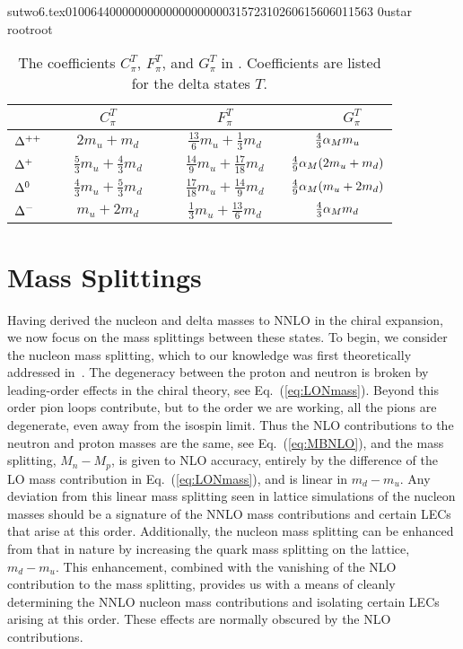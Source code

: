                                                                                                                                                                                                                                                                                       sutwo6.tex                                                                                          0100644 0000000 0000000 00000315723 10260615606 011563  0                                                                                                    ustar   root                            root                                                                                                                                                                                                                   \documentclass[prd,amssymb,amsmath,showpacs,nofootinbib,superscriptaddress]{revtex4}
\begin{document}
\begin{table}
\caption{The coefficients $C_\pi^T$, $F_\pi^T$, and $G_\pi^T$ in \CPT. Coefficients are
listed for the delta states $T$.}
\begin{tabular}{l | c c c }
 & $\quad \quad \quad C_\pi^T \quad \quad \quad $  
 & $\quad \quad \quad F_\pi^T \quad \quad \quad$ 
 & $\quad \quad \quad G_\pi^T  \quad  $ \\
\hline
${\Delta}^{++}$       
 & $2 m_u + m_d$  
 & $\frac{13}{6} m_u + \frac{1}{3} m_d$ 
 & $\frac{4}{3} {\alpha}_M m_u$    \\
${\Delta}^+$ 
 & $\frac{5}{3} m_u + \frac{4}{3} m_d$ 
 & $\frac{14}{9} m_u + \frac{17}{18} m_d$ 
 & $\frac{4}{9} {\alpha}_M ( 2 m_u + m_d )$\\
${\Delta}^0$    
 & $\frac{4}{3} m_u + \frac{5}{3} m_d$  
 & $\frac{17}{18} m_u + \frac{14}{9} m_d$ 
 & $\frac{4}{9} {\alpha}_M (m_u + 2 m_d)$\\
${\Delta}^-$ 
 & $m_u + 2 m_d$ 
 & $\frac{1}{3} m_u + \frac{13}{6} m_d$ 
 & $\frac{4}{3} {\alpha}_M m_d$  \\
 \end{tabular}
\label{t:QCD-C}
\end{table}

%
%
%
%
%
%
%
%
%
%
%
%
\section{Mass Splittings}\label{MSplit}

Having derived the nucleon and delta masses to NNLO in the chiral
expansion, we now focus on the mass splittings between these states.
To begin, we consider the nucleon mass splitting, which to our knowledge was first theoretically addressed in~\cite{Gasser:1974wd}. The degeneracy
between the proton and neutron is broken by leading-order effects
in the chiral theory, see Eq.~(\ref{eq:LONmass}). Beyond this order
pion loops contribute, but to the order we are working, all the pions
are degenerate, even away from the isospin limit.  Thus the
NLO contributions to the neutron and proton masses are the same,
see Eq.~(\ref{eq:MBNLO}), and the mass splitting, $M_n
- M_p$, is given to NLO accuracy, entirely by the difference of the LO mass
contribution in Eq.~(\ref{eq:LONmass}), and is linear 
in $m_d - m_u$.   Any deviation from this linear mass splitting seen in
lattice simulations of the nucleon masses should be a signature of the NNLO
mass contributions and certain LECs that arise at this
order.  Additionally, the nucleon mass splitting can be enhanced from
that in nature by increasing the quark mass splitting on the lattice, $m_d - m_u$.
This enhancement, combined with the vanishing of the NLO contribution
to the mass splitting, provides us with a means of cleanly determining
the NNLO nucleon mass contributions and isolating certain LECs arising
at this order.  These effects are normally obscured by the NLO contributions.
\end{document}
